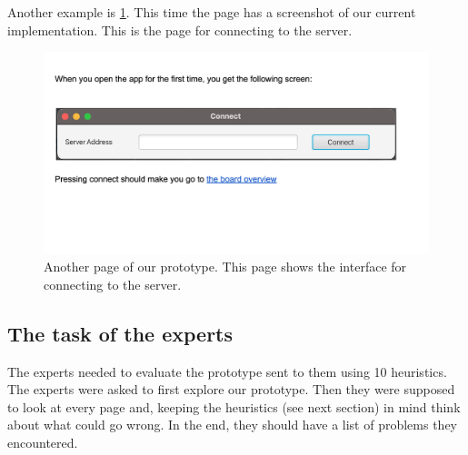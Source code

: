Another example is \ref{fig:ExamplePrototypeConnect}. This time the page has a screenshot of our current implementation. This is the page for connecting to the server.


\begin{figure}
    \centering
    \includegraphics[width=\linewidth]{images/ExamplePrototypeConnect.png}
    \caption{Another page of our prototype. This page shows the interface for connecting to the server.}
    \label{fig:ExamplePrototypeConnect}
\end{figure}

\subsection{The task of the experts}
The experts needed to evaluate the prototype sent to them using 10 heuristics. The experts were asked to first explore our prototype. Then they were supposed to look at every page and, keeping the heuristics (see next section) in mind think about what could go wrong. In the end, they should have a list of problems they encountered.

